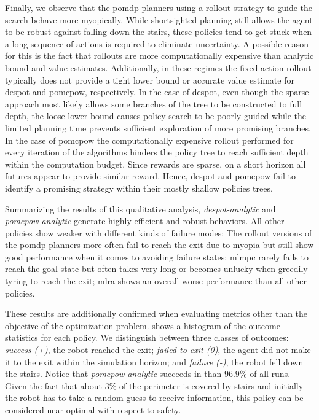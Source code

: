 Finally, we observe that the \ac{pomdp} planners using a rollout strategy to
guide the search behave more myopically. While shortsighted planning still allows
the agent to be robust against falling down the stairs, these policies tend to
get stuck when a long sequence of actions is required to eliminate uncertainty.
A possible reason for this is the fact that rollouts are more computationally
expensive than analytic bound and value estimates. Additionally, in these
regimes the fixed-action rollout typically does not provide a tight lower bound
or accurate value estimate for \ac{despot} and \ac{pomcpow}, respectively. In
the case of \ac{despot}, even though the sparse approach most likely allows
some branches of the tree to be constructed to full depth, the loose lower
bound causes policy search to be poorly guided while the limited planning time
prevents sufficient exploration of more promising branches. In the case of
\ac{pomcpow} the computationally expensive rollout performed for every iteration
of the algorithms hinders the policy tree to reach sufficient depth within
the computation budget. Since rewards are sparse, on a short horizon all
futures appear to provide similar reward. Hence, \ac{despot} and \ac{pomcpow}
fail to identify a promising strategy within their mostly shallow policies trees.


Summarizing the results of this qualitative analysis,
\emph{\ac{despot}-analytic} and \emph{\ac{pomcpow}-analytic} generate highly
efficient and robust behaviors. All other policies show weaker with different
kinds of failure modes: The rollout versions of the \ac{pomdp} planners more
often fail to reach the exit due to myopia but still show good performance when
it comes to avoiding failure states; \ac{mlmpc} rarely fails to reach the goal
state but often takes very long or becomes unlucky when greedily tyring to
reach the exit; \ac{mlra} shows an overall worse performance than all other
policies.

These results are additionally confirmed when evaluating metrics other than the
objective of the optimization problem.  shows a histogram
of the outcome statistics for each policy. We distinguish between three classes
of outcomes: \emph{success (+)}, the robot reached the exit; \emph{failed to
exit (0)}, the agent did not make it to the exit within the simulation horizon;
and \emph{failure (-)}, the robot fell down the stairs. Notice that
\emph{\ac{pomcpow}-analytic} succeeds in than $96.9\%$ of all runs. Given the
fact that about $3\%$ of the perimeter is covered by stairs and initially the
robot has to take a random guess to receive information, this policy can be
considered near optimal with respect to safety.

